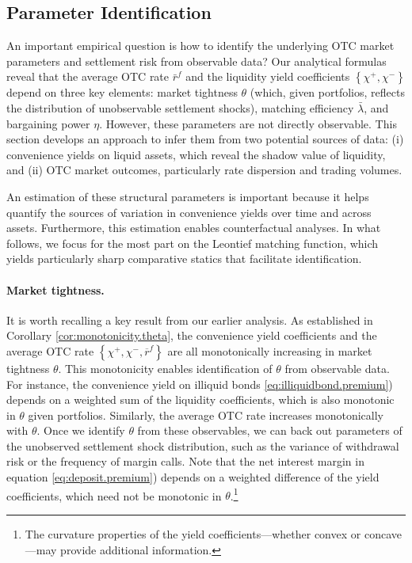 \documentclass[12pt,american,english,notitlepage]{article}
\begin{document}
\subsection{Parameter Identification}

An important empirical question is how to identify the underlying OTC market parameters
and settlement risk from observable data? Our analytical formulas
reveal that the average OTC rate $\bar{r}^{f}$ and the liquidity
yield coefficients $\left\{ \chi^{+},\chi^{-}\right\} $ depend on
three key elements: market tightness $\theta$ (which, given portfolios,
reflects the distribution of unobservable settlement shocks), matching
efficiency $\bar{\lambda}$, and bargaining power $\eta$. However, these parameters are not directly observable. This section develops
an approach to infer them from two potential sources of data: (i)
convenience yields on liquid assets, which reveal the shadow value
of liquidity, and (ii) OTC market outcomes, particularly rate dispersion
and trading volumes.

An estimation of these structural parameters is important because it helps quantify the sources of variation in convenience yields over time and across assets. Furthermore, this estimation enables counterfactual analyses. In what follows, we focus for the most part on the Leontief matching function, which yields particularly sharp comparative statics that facilitate identification. 

\paragraph{Market tightness.}

It is worth recalling a key result from our earlier analysis. As established
in Corollary \ref{cor:monotonicity.theta}, the convenience yield coefficients
and the average OTC rate $\left\{ \chi^{+},\chi^{-},\overline{r}^{f}\right\} $
are all monotonically increasing in market tightness $\theta$. This
monotonicity enables identification of $\theta$ from observable data.
For instance, the convenience yield on illiquid bonds \eqref{eq:illiquidbond.premium})
depends on a weighted sum of the liquidity coefficients, which is
also monotonic in $\theta$ given portfolios. Similarly, the average
OTC rate increases monotonically with $\theta$. Once we identify
$\theta$ from these observables, we can back out parameters of the
unobserved settlement shock distribution, such as the variance of
withdrawal risk or the frequency of margin calls. Note that the net
interest margin in equation \eqref{eq:deposit.premium}) depends on
a weighted difference of the yield coefficients, which need not be
monotonic in $\theta$.\footnote{The curvature properties of the yield coefficients---whether convex
or concave---may provide additional information.}
\end{document}
